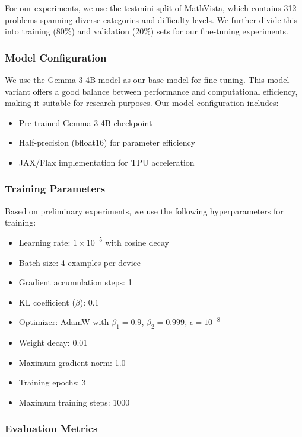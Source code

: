 \documentclass[11pt,a4paper]{article}
\begin{document}
For our experiments, we use the testmini split of MathVista, which contains 312 problems spanning diverse categories and difficulty levels. We further divide this into training (80\%) and validation (20\%) sets for our fine-tuning experiments.

\subsubsection{Model Configuration}

We use the Gemma 3 4B model as our base model for fine-tuning. This model variant offers a good balance between performance and computational efficiency, making it suitable for research purposes. Our model configuration includes:

\begin{itemize}
    \item Pre-trained Gemma 3 4B checkpoint
    \item Half-precision (bfloat16) for parameter efficiency
    \item JAX/Flax implementation for TPU acceleration
\end{itemize}

\subsubsection{Training Parameters}

Based on preliminary experiments, we use the following hyperparameters for training:

\begin{itemize}
    \item Learning rate: $1 \times 10^{-5}$ with cosine decay
    \item Batch size: 4 examples per device
    \item Gradient accumulation steps: 1
    \item KL coefficient ($\beta$): 0.1
    \item Optimizer: AdamW with $\beta_1 = 0.9$, $\beta_2 = 0.999$, $\epsilon = 10^{-8}$
    \item Weight decay: 0.01
    \item Maximum gradient norm: 1.0
    \item Training epochs: 3
    \item Maximum training steps: 1000
\end{itemize}

\subsubsection{Evaluation Metrics}
\end{document}

